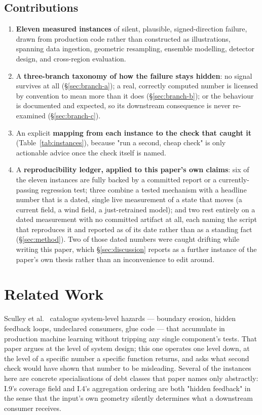 \subsection{Contributions}

\begin{enumerate}\itemsep2pt
\item \textbf{Eleven measured instances} of silent, plausible, signed-direction
failure, drawn from production code rather than constructed as illustrations,
spanning data ingestion, geometric resampling, ensemble modelling, detector
design, and cross-region evaluation.
\item A \textbf{three-branch taxonomy of how the failure stays hidden}: no
signal survives at all (\S\ref{sec:branch-a}); a real, correctly computed
number is licensed by convention to mean more than it does
(\S\ref{sec:branch-b}); or the behaviour is documented and expected, so its
downstream consequence is never re-examined (\S\ref{sec:branch-c}).
\item An explicit \textbf{mapping from each instance to the check that caught
it} (Table~\ref{tab:instances}), because "run a second, cheap check" is only
actionable advice once the check itself is named.
\item A \textbf{reproducibility ledger, applied to this paper's own claims}:
six of the eleven instances are fully backed by a committed report or a
currently-passing regression test; three combine a tested mechanism with a
headline number that is a dated, single live measurement of a state that
moves (a current field, a wind field, a just-retrained model); and two rest
entirely on a dated measurement with no committed artifact at all, each
naming the script that reproduces it and reported as of its date rather
than as a standing fact (\S\ref{sec:method}). Two of those dated numbers
were caught drifting while
writing this paper, which \S\ref{sec:discussion} reports as a further
instance of the paper's own thesis rather than an inconvenience to edit
around.
\end{enumerate}

\section{Related Work}
\label{sec:related}

 Sculley et al.~\citep{sculley2015}
catalogue system-level hazards --- boundary erosion, hidden feedback loops,
undeclared consumers, glue code --- that accumulate in production machine
learning without tripping any single component's tests. That paper argues
at the level of system design; this one operates one level down, at the
level of a specific number a specific function returns, and asks what
second check would have shown that number to be misleading. Several of the
instances here are concrete specialisations of debt classes that paper names
only abstractly: I.9's coverage field and I.4's aggregation ordering are
both "hidden feedback" in the sense that the input's own geometry silently
determines what a downstream consumer receives.

